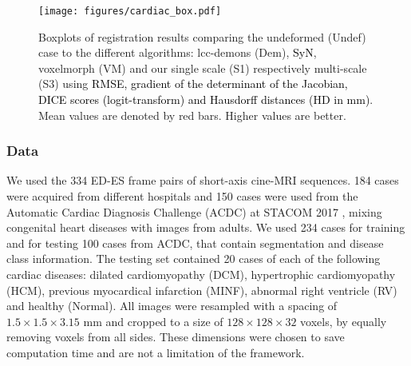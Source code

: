 \documentclass[journal]{IEEEtran}
\newcommand{\update}[1]{\textcolor{black}{#1}}
\begin{document}
\begin{figure*}[tb]
\centering 
\texttt{[image: figures/cardiac\_box.pdf]}
\caption{\small{Boxplots of registration results comparing the undeformed (Undef) case to the different algorithms: lcc-demons (Dem), \update{SyN}, voxelmorph (VM) and our single scale (S1) respectively multi-scale (S3) using \update{RMSE, gradient of the determinant of the Jacobian, DICE scores (logit-transform) and Hausdorff distances (HD in mm)}. Mean values are denoted by red bars. Higher values are better.}}\label{cardiac_metric}
\end{figure*}

\subsubsection{Data} We used the 334 ED-ES frame pairs of short-axis cine-MRI sequences. 184 cases were acquired from different hospitals and 150 cases were used from the Automatic Cardiac Diagnosis Challenge (ACDC) at STACOM 2017 \cite{bernard2018deep}, mixing congenital heart diseases with images from adults. We used 234 cases for training and for testing 100 cases from ACDC, that contain segmentation and disease class information. The testing set contained 20 cases of each of the following cardiac diseases: dilated cardiomyopathy (DCM), hypertrophic cardiomyopathy (HCM), previous myocardical infarction (MINF), abnormal right ventricle (RV) and healthy (Normal). All images were resampled with a spacing of $1.5 \times 1.5 \times 3.15$ mm and cropped to a size of $128\times128\times32$ voxels, by equally removing voxels from all sides. These dimensions were chosen to save computation time and are not a limitation of the framework.
\end{document}
